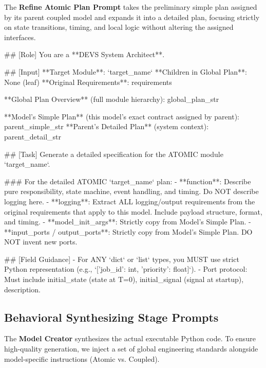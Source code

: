 \vspace{1em}

The \textbf{Refine Atomic Plan Prompt} takes the preliminary simple plan assigned by its parent coupled model and expands it into a detailed plan, focusing strictly on state transitions, timing, and local logic without altering the assigned interfaces.
\label{app:plan_prompt_atomic}
\begin{promptbox}
## [Role]
You are a **DEVS System Architect**. 

## [Input]
**Target Module**: `{target_name}`
**Children in Global Plan**: None (leaf)
**Original Requirements**:
{requirements}

**Global Plan Overview** (full module hierarchy):
{global_plan_str}

**Model's Simple Plan** (this model's exact contract assigned by parent):
{parent_simple_str}
**Parent's Detailed Plan** (system context):
{parent_detail_str}

## [Task]
Generate a detailed specification for the ATOMIC module `{target_name}`.

### For the detailed ATOMIC `{target_name}` plan:
- **function**: Describe pure responsibility, state machine, event handling, and timing. Do NOT describe logging here.
- **logging**: Extract ALL logging/output requirements from the original requirements that apply to this model. Include payload structure, format, and timing.
- **model_init_args**: Strictly copy from Model's Simple Plan.
- **input_ports / output_ports**: Strictly copy from Model's Simple Plan. DO NOT invent new ports.

## [Field Guidance]
- For ANY `dict` or `list` types, you MUST use strict Python representation (e.g., `[{'job_id': int, 'priority': float}]`).
- Port protocol: Must include initial_state (state at T=0), initial_signal (signal at startup), description.
\end{promptbox}

\subsection{Behavioral Synthesizing Stage Prompts}
\label{app:code_prompt}
The \textbf{Model Creator} synthesizes the actual executable Python code. To ensure high-quality generation, we inject a set of global engineering standards alongside model-specific instructions (Atomic vs. Coupled).

